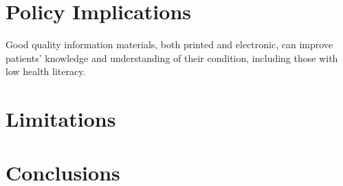 \documentclass[12pt]{report}
\begin{document}
\chapter{Policy Implications}
Good quality information materials, both printed and electronic, can improve patients' knowledge and understanding of their condition, including those with low health literacy.

\chapter{Limitations}

\chapter{Conclusions}

\newpage


\end{document}
